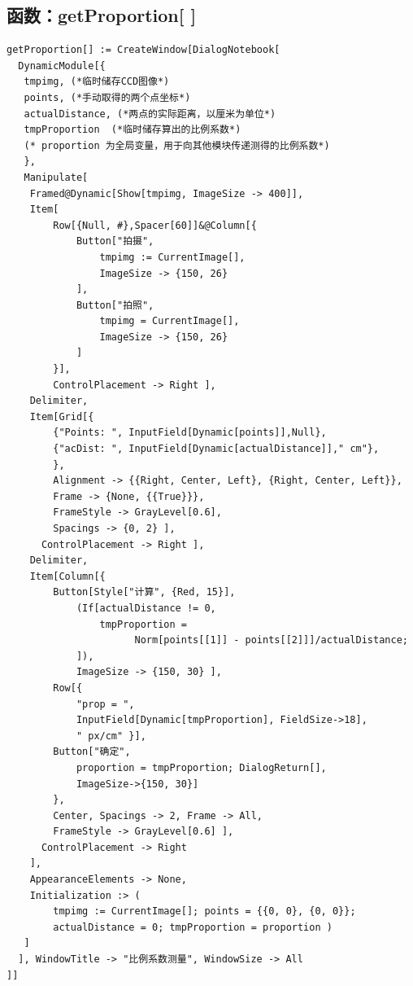 \documentclass[UTF8,a4paper,12pt]{article}
\begin{document}
\subsection{函数：getProportion[ ]}

\begin{verbatim}
getProportion[] := CreateWindow[DialogNotebook[
  DynamicModule[{
   tmpimg, (*临时储存CCD图像*)
   points, (*手动取得的两个点坐标*)
   actualDistance, (*两点的实际距离，以厘米为单位*)
   tmpProportion  (*临时储存算出的比例系数*)
   (* proportion 为全局变量，用于向其他模块传递测得的比例系数*)
   },
   Manipulate[
    Framed@Dynamic[Show[tmpimg, ImageSize -> 400]],
    Item[
        Row[{Null, #},Spacer[60]]&@Column[{
            Button["拍摄", 
                tmpimg := CurrentImage[], 
                ImageSize -> {150, 26}
            ],
            Button["拍照",
                tmpimg = CurrentImage[],
                ImageSize -> {150, 26}
            ]
        }], 
        ControlPlacement -> Right ],
    Delimiter,
    Item[Grid[{
        {"Points: ", InputField[Dynamic[points]],Null},
        {"acDist: ", InputField[Dynamic[actualDistance]]," cm"},
        },
        Alignment -> {{Right, Center, Left}, {Right, Center, Left}},
        Frame -> {None, {{True}}},
        FrameStyle -> GrayLevel[0.6],
        Spacings -> {0, 2} ], 
      ControlPlacement -> Right ],
    Delimiter,
    Item[Column[{
        Button[Style["计算", {Red, 15}],
            (If[actualDistance != 0,
                tmpProportion = 
                      Norm[points[[1]] - points[[2]]]/actualDistance;
            ]),
            ImageSize -> {150, 30} ],
        Row[{
            "prop = ",
            InputField[Dynamic[tmpProportion], FieldSize->18],
            " px/cm" }],
        Button["确定", 
            proportion = tmpProportion; DialogReturn[],
            ImageSize->{150, 30}]
        }, 
        Center, Spacings -> 2, Frame -> All, 
        FrameStyle -> GrayLevel[0.6] ],
      ControlPlacement -> Right
    ],
    AppearanceElements -> None,
    Initialization :> (
        tmpimg := CurrentImage[]; points = {{0, 0}, {0, 0}};
        actualDistance = 0; tmpProportion = proportion )
   ]
  ], WindowTitle -> "比例系数测量", WindowSize -> All
]]
\end{verbatim}

\newpage
\end{document}
